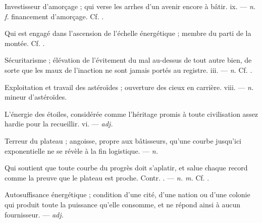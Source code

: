  Investisseur d'amorçage ; qui verse les arrhes d'un avenir encore à bâtir.   ix. ---  \textit{n. f.} financement d'amorçage. Cf. .

 Qui est engagé dans l'ascension de l'échelle énergétique ; membre du parti de la montée.  Cf. .

 Sécuritarisme ; élévation de l'évitement du mal au-dessus de tout autre bien, de sorte que les maux de l'inaction ne sont jamais portés au registre.   iii. ---  \textit{n.} Cf. .

 Exploitation et travail des astéroïdes ; ouverture des cieux en carrière.   viii. ---  \textit{n.} mineur d'astéroïdes.

 L'énergie des étoiles, considérée comme l'héritage promis à toute civilisation assez hardie pour la recueillir.   vi. ---  \textit{adj.}

 Terreur du plateau ; angoisse, propre aux bâtisseurs, qu'une courbe jusqu'ici exponentielle ne se révèle à la fin logistique. ---  \textit{n.}

 Qui soutient que toute courbe du progrès doit s'aplatir, et salue chaque record comme la preuve que le plateau est proche. Contr. . ---  \textit{n. m.} Cf. .

 Autosuffisance énergétique ; condition d'une cité, d'une nation ou d'une colonie qui produit toute la puissance qu'elle consomme, et ne répond ainsi à aucun fournisseur. ---  \textit{adj.}

